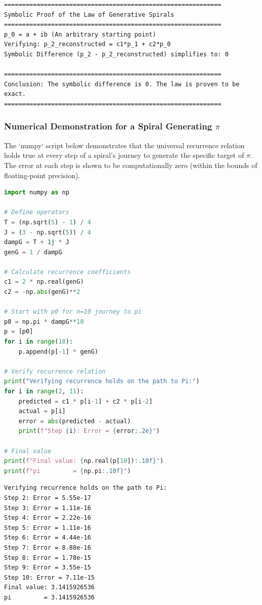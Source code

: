 \begin{verbatim}
============================================================
Symbolic Proof of the Law of Generative Spirals
============================================================
p_0 = a + ib (An arbitrary starting point)
Verifying: p_2_reconstructed = c1*p_1 + c2*p_0
Symbolic Difference (p_2 - p_2_reconstructed) simplifies to: 0

============================================================
Conclusion: The symbolic difference is 0. The law is proven to be exact.
============================================================
\end{verbatim}

\subsubsection{Numerical Demonstration for a Spiral Generating \texorpdfstring{$\pi$}{π}}
The `numpy` script below demonstrates that the universal recurrence relation holds true at every step of a spiral's journey to generate the specific target of $\pi$. The error at each step is shown to be computationally zero (within the bounds of floating-point precision).

\begin{lstlisting}[language=Python, caption={Numerical verification of the recurrence relation for a spiral generating pi.}, label={lst:pi_recurrence_verify}]
import numpy as np

# Define operators
T = (np.sqrt(5) - 1) / 4
J = (3 - np.sqrt(5)) / 4
dampG = T + 1j * J
genG = 1 / dampG

# Calculate recurrence coefficients
c1 = 2 * np.real(genG)
c2 = -np.abs(genG)**2

# Start with p0 for n=10 journey to pi
p0 = np.pi * dampG**10
p = [p0]
for i in range(10):
    p.append(p[-1] * genG)

# Verify recurrence relation
print("Verifying recurrence holds on the path to Pi:")
for i in range(2, 11):
    predicted = c1 * p[i-1] + c2 * p[i-2]
    actual = p[i]
    error = abs(predicted - actual)
    print(f"Step {i}: Error = {error:.2e}")

# Final value
print(f"Final value: {np.real(p[10]):.10f}")
print(f"pi         = {np.pi:.10f}")
\end{lstlisting}

\begin{verbatim}
Verifying recurrence holds on the path to Pi:
Step 2: Error = 5.55e-17
Step 3: Error = 1.11e-16
Step 4: Error = 2.22e-16
Step 5: Error = 1.11e-16
Step 6: Error = 4.44e-16
Step 7: Error = 8.88e-16
Step 8: Error = 1.78e-15
Step 9: Error = 3.55e-15
Step 10: Error = 7.11e-15
Final value: 3.1415926536
pi         = 3.1415926536
\end{verbatim}

